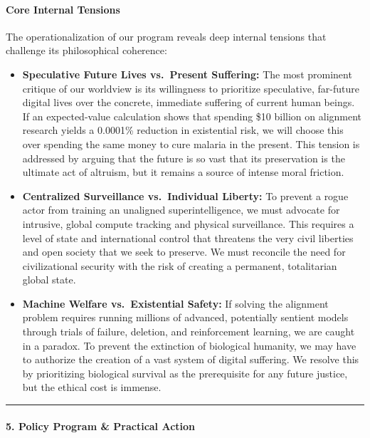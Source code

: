 \paragraph{Core Internal Tensions}\label{core-internal-tensions}

The operationalization of our program reveals deep internal tensions
that challenge its philosophical coherence:

\begin{itemize}
\tightlist
\item
  \textbf{Speculative Future Lives vs.~Present Suffering:} The most
  prominent critique of our worldview is its willingness to prioritize
  speculative, far-future digital lives over the concrete, immediate
  suffering of current human beings. If an expected-value calculation
  shows that spending \$10 billion on alignment research yields a
  0.0001\% reduction in existential risk, we will choose this over
  spending the same money to cure malaria in the present. This tension
  is addressed by arguing that the future is so vast that its
  preservation is the ultimate act of altruism, but it remains a source
  of intense moral friction.
\item
  \textbf{Centralized Surveillance vs.~Individual Liberty:} To prevent a
  rogue actor from training an unaligned superintelligence, we must
  advocate for intrusive, global compute tracking and physical
  surveillance. This requires a level of state and international control
  that threatens the very civil liberties and open society that we seek
  to preserve. We must reconcile the need for civilizational security
  with the risk of creating a permanent, totalitarian global state.
\item
  \textbf{Machine Welfare vs.~Existential Safety:} If solving the
  alignment problem requires running millions of advanced, potentially
  sentient models through trials of failure, deletion, and reinforcement
  learning, we are caught in a paradox. To prevent the extinction of
  biological humanity, we may have to authorize the creation of a vast
  system of digital suffering. We resolve this by prioritizing
  biological survival as the prerequisite for any future justice, but
  the ethical cost is immense.
\end{itemize}

\begin{center}\rule{0.5\linewidth}{0.5pt}\end{center}

\paragraph{5. Policy Program \& Practical
Action}\label{policy-program-practical-action-2}

